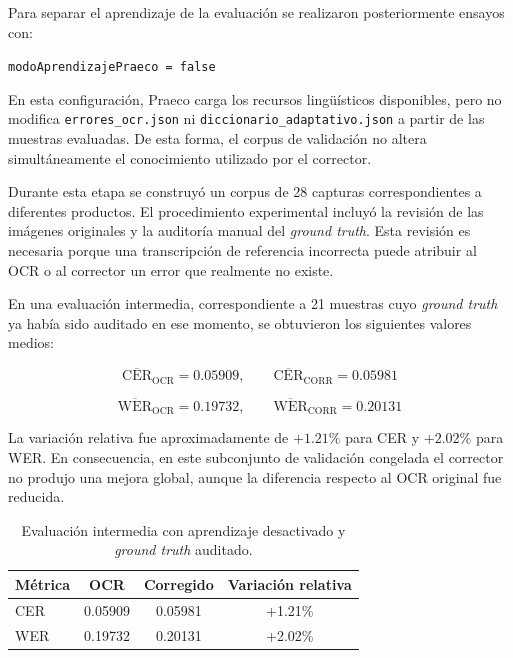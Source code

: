 Para separar el aprendizaje de la evaluación se realizaron posteriormente ensayos con:

\begin{center}
	\texttt{modoAprendizajePraeco = false}
\end{center}

En esta configuración, Praeco carga los recursos lingüísticos disponibles, pero no modifica \texttt{errores\_ocr.json} ni \texttt{diccionario\_adaptativo.json} a partir de las muestras evaluadas. De esta forma, el corpus de validación no altera simultáneamente el conocimiento utilizado por el corrector.

Durante esta etapa se construyó un corpus de 28 capturas correspondientes a diferentes productos. El procedimiento experimental incluyó la revisión de las imágenes originales y la auditoría manual del \textit{ground truth}. Esta revisión es necesaria porque una transcripción de referencia incorrecta puede atribuir al OCR o al corrector un error que realmente no existe.

En una evaluación intermedia, correspondiente a 21 muestras cuyo \textit{ground truth} ya había sido auditado en ese momento, se obtuvieron los siguientes valores medios:

\begin{equation}
	\overline{\mathrm{CER}}_{\mathrm{OCR}}=0.05909,
	\qquad
	\overline{\mathrm{CER}}_{\mathrm{CORR}}=0.05981
\end{equation}

\begin{equation}
	\overline{\mathrm{WER}}_{\mathrm{OCR}}=0.19732,
	\qquad
	\overline{\mathrm{WER}}_{\mathrm{CORR}}=0.20131
\end{equation}

La variación relativa fue aproximadamente de $+1.21\%$ para CER y $+2.02\%$ para WER. En consecuencia, en este subconjunto de validación congelada el corrector no produjo una mejora global, aunque la diferencia respecto al OCR original fue reducida.

\begin{table}[htbp]
	\centering
	\caption{Evaluación intermedia con aprendizaje desactivado y \textit{ground truth} auditado.}
	\label{tab:validacion-congelada}
	\vspace{0.2cm}
	\begin{tabular}{lccc}
		\toprule
		\textbf{Métrica} & \textbf{OCR} & \textbf{Corregido} & \textbf{Variación relativa} \\
		\midrule
		CER & 0.05909 & 0.05981 & +1.21\% \\
		WER & 0.19732 & 0.20131 & +2.02\% \\
		\bottomrule
	\end{tabular}
\end{table}

